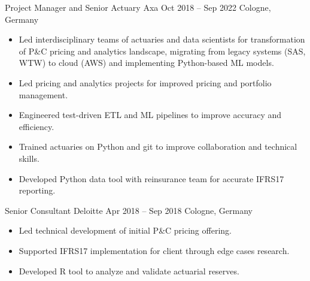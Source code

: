 \documentclass[a4paper,]{fortysecondscv}
\begin{document}
\begin{cvtable}
    \vspace{\topsep}
    \cvitemoneblock
    {Project Manager and Senior Actuary}
    {Axa}
    {Oct 2018 -- Sep 2022}
    {Cologne, Germany}
    {
        \begin{itemize}[nosep, leftmargin=12pt , label={-}] %
            \item Led interdisciplinary teams of actuaries and data scientists for transformation of P\&C pricing and analytics landscape, migrating from legacy systems \/(SAS, WTW\/) to cloud \/(AWS\/) and implementing Python-based ML models.
            \item Led pricing and analytics projects for improved pricing and portfolio management.
            \item Engineered test-driven ETL and ML pipelines to improve accuracy and efficiency.
            \item Trained actuaries on Python and git to improve collaboration and technical skills.
            \item Developed Python data tool with reinsurance team for accurate IFRS17 reporting.
        \end{itemize}
    }
    \vspace{\topsep}
    \cvitemoneblock
    {Senior Consultant}
    {Deloitte}
    {Apr 2018 -- Sep 2018}
    {Cologne, Germany}
    {
        \begin{itemize}[nosep, leftmargin=12pt , label={-}] %
            \item Led technical development of initial P\&C pricing offering.
            \item Supported IFRS17 implementation for client through edge cases research.
            \item Developed R tool to analyze and validate actuarial reserves.

\end{itemize}}
\end{cvtable}
\end{document}
